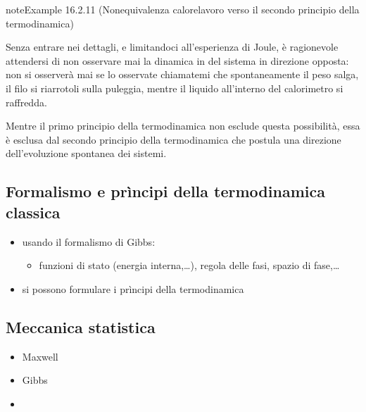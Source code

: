 \documentclass[letterpaper,10pt,italian]{jupyterBook}
\begin{document}
\begin{sphinxadmonition}{note}{Example 16.2.11 (Non\sphinxhyphen{}equivalenza calore\sphinxhyphen{}lavoro \sphinxhyphen{} verso il secondo principio della termodinamica)}



\sphinxAtStartPar
Senza entrare nei dettagli, e limitandoci all’esperienza di Joule, è ragionevole attendersi di non osservare mai la dinamica in del sistema in direzione opposta: non si osserverà mai \sphinxhyphen{} se lo osservate chiamatemi \sphinxhyphen{} che spontaneamente il peso salga, il filo si ri\sphinxhyphen{}arrotoli sulla puleggia, mentre il liquido all’interno del calorimetro si raffredda.

\sphinxAtStartPar
Mentre il primo principio della termodinamica non esclude questa possibilità, essa è esclusa dal secondo principio della termodinamica che postula una direzione dell’evoluzione spontanea dei sistemi.
\end{sphinxadmonition}


\subsection{Formalismo e prìncipi della termodinamica classica}
\label{\detokenize{ch/thermodynamics/foundation-experiments:formalismo-e-principi-della-termodinamica-classica}}\label{\detokenize{ch/thermodynamics/foundation-experiments:physics-hs-thermodynamics-foundation-experiments-gibbs}}
\sphinxAtStartPar
{}
\begin{itemize}
\item {} 
\sphinxAtStartPar
usando il formalismo di Gibbs:
\begin{itemize}
\item {} 
\sphinxAtStartPar
funzioni di stato (energia interna,…), regola delle fasi, spazio di fase,…

\end{itemize}

\item {} 
\sphinxAtStartPar
si possono formulare i prìncipi della termodinamica

\end{itemize}


\subsection{Meccanica statistica}
\label{\detokenize{ch/thermodynamics/foundation-experiments:meccanica-statistica}}\label{\detokenize{ch/thermodynamics/foundation-experiments:physics-hs-thermodynamics-foundation-experiments-stat-mech}}\begin{itemize}
\item {} 
\sphinxAtStartPar
Maxwell

\item {} 
\sphinxAtStartPar
Gibbs

\item {} 
\sphinxAtStartPar
{}

\end{itemize}
\end{document}
